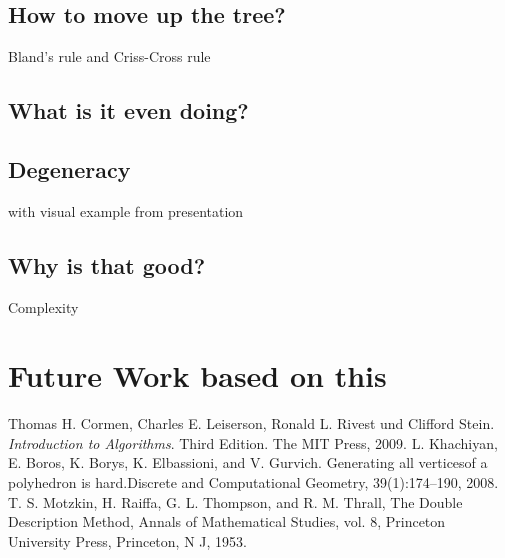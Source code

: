 \documentclass[a4paper, 11pt]{article}
\begin{document}
\subsection{How to move up the tree?}
Bland's rule and Criss-Cross rule
\subsection{What is it even doing?}
\subsection{Degeneracy}
with visual example from presentation
\subsection{Why is that good?}
Complexity

\section{Future Work based on this }

\newpage

\begin{thebibliography}{9}
	Thomas H. Cormen, Charles E. Leiserson, Ronald L. Rivest und Clifford Stein.
	\textit{Introduction to Algorithms}. Third Edition. The MIT Press, 2009.
	L. Khachiyan, E. Boros, K. Borys, K. Elbassioni, and V. Gurvich. Generating all
	verticesof a polyhedron is hard.Discrete and Computational Geometry,
	39(1):174–190, 2008.
	T. S. Motzkin, H. Raiffa, G. L. Thompson, and R. M. Thrall, The Double Description Method,
	Annals of Mathematical Studies, vol. 8, Princeton University Press, Princeton, N J, 1953.
\end{thebibliography}
\end{document}

